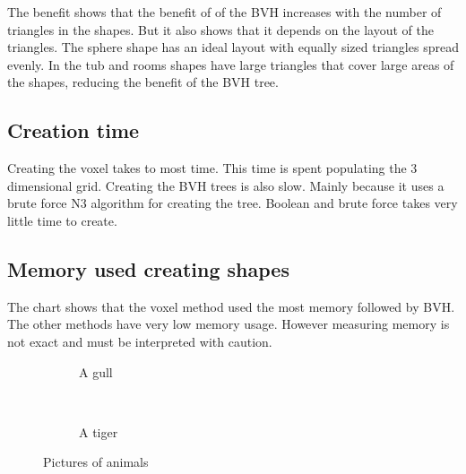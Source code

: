 \documentclass[11pt,twoside,a4paper]{report}
\begin{document}
The benefit shows that the benefit of of the BVH increases with the number of triangles in the shapes. But it also shows that it depends on the layout of the triangles. The sphere shape has an ideal layout with equally sized triangles spread evenly. In the tub and rooms shapes have large triangles that cover large areas of the shapes, reducing the benefit of the BVH tree.

\subsection{Creation time}
Creating the voxel  takes to most time. This time is spent populating the 3 dimensional grid. Creating the BVH trees is also slow. Mainly because it uses a brute force N3 algorithm for creating the tree. Boolean and brute force takes very little time to create.

\subsection{Memory used creating shapes}
The chart shows that the voxel method used the most memory followed by BVH. The other methods have very low memory usage. However measuring memory is not exact and must be interpreted with caution. 

\begin{figure}[h]
        \centering
        \begin{subfigure}[h]{0.3\textwidth}
                \caption{A gull}
                \label{fig:gull}
        \end{subfigure}%
        ~ %
        \begin{subfigure}[h]{0.3\textwidth}
                \caption{A tiger}
                \label{fig:tiger}
        \end{subfigure}
        \caption{Pictures of animals}\label{fig:animals}
\end{figure}
\end{document}
